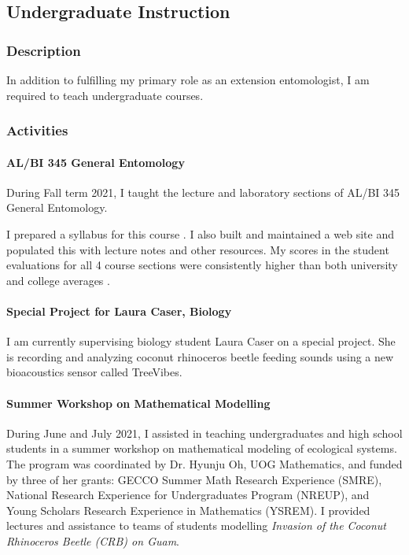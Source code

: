 \subsection{Undergraduate Instruction}
\begin{refsection}
	
\subsubsection{Description}

In addition to fulfilling my primary role as an extension entomologist, I am required to teach undergraduate courses.

\subsubsection{Activities}


\paragraph{AL/BI 345 General Entomology}
During Fall term 2021, I taught the lecture and laboratory sections of AL/BI 345 General Entomology.

I prepared a syllabus for this course \cite{moore_syllabus_2021}. I also built and maintained a web site \cite{moore_web_2021} and populated this with lecture notes and other resources.  My scores in the student evaluations for all 4 course sections were consistently higher than both university and college averages \cite{moore_instructor_2021}.

\paragraph{Special Project for Laura Caser, Biology}
I am currently supervising biology student Laura Caser on a special project. She is recording and analyzing coconut rhinoceros beetle feeding sounds using a new bioacoustics sensor called TreeVibes.

\paragraph{Summer Workshop on Mathematical Modelling}

During June and July 2021, I assisted in teaching undergraduates and high school students in a summer workshop on mathematical modeling of ecological systems. The program was coordinated by Dr. Hyunju Oh, UOG Mathematics, and funded by three of her grants: GECCO Summer Math Research Experience (SMRE), National Research Experience for Undergraduates Program (NREUP), and Young Scholars Research Experience in Mathematics (YSREM). I provided lectures and assistance to teams of students modelling \textit{Invasion of the Coconut Rhinoceros Beetle (CRB) on Guam}.


\end{refsection}
